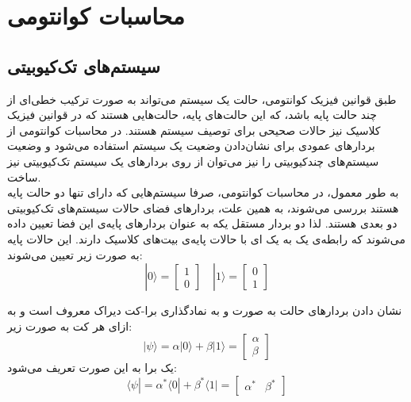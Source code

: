 

\section{محاسبات کوانتومی}

\subsection{سیستم‌های تک‌کیوبیتی}

طبق قوانین فیزیک کوانتومی، حالت یک سیستم می‌تواند به صورت ترکیب خطی‌ای از چند حالت پایه باشد، که این حالت‌های پایه، حالت‌هایی هستند که در قوانین فیزیک کلاسیک نیز حالات صحیحی برای توصیف سیستم هستند.
در محاسبات کوانتومی از بردارهای عمودی برای نشان‌دادن وضعیت یک سیستم استفاده می‌شود و وضعیت سیستم‌های چندکیوبیتی را نیز می‌توان از روی بردارهای یک سیستم تک‌کیوبیتی نیز ساخت.
\\
به طور معمول، در محاسبات کوانتومی، صرفا سیستم‌هایی که دارای تنها دو حالت پایه هستند بررسی می‌شوند، به همین علت، بردارهای فضای حالات سیستم‌های تک‌کیوبیتی دو بعدی هستند. لذا دو بردار مستقل یکه به عنوان بردارهای پایه‌ی این فضا تعیین داده می‌شوند که رابطه‌ی یک به یک ای با حالات پایه‌ی بیت‌های کلاسیک دارند.
این حالات پایه به صورت زیر تعیین می‌شوند:
\begin{equation}
    |0\rangle = \begin{bmatrix} 1 \\ 0 \end{bmatrix} 
    \mspace{18mu}
    |1\rangle = \begin{bmatrix} 0 \\ 1 \end{bmatrix}
\end{equation} 

نشان دادن بردارهای حالت به صورت 
\lr{$|0\rangle$} و \lr{$|1\rangle$}
به نمادگذاری برا-کت دیراک معروف است و به ازای هر کت
به صورت زیر:
\begin{equation}
    |\psi\rangle = \alpha |0\rangle + \beta |1\rangle
    = \begin{bmatrix}
    \alpha \\[3pt]
    \beta
    \end{bmatrix}
\end{equation}
یک برا
به این صورت تعریف می‌شود:
\begin{equation}
    \langle \psi| = \alpha^* \langle0| + \beta^* \langle1| = \begin{bmatrix} \alpha^* & \beta^* \end{bmatrix} 
\end{equation}

